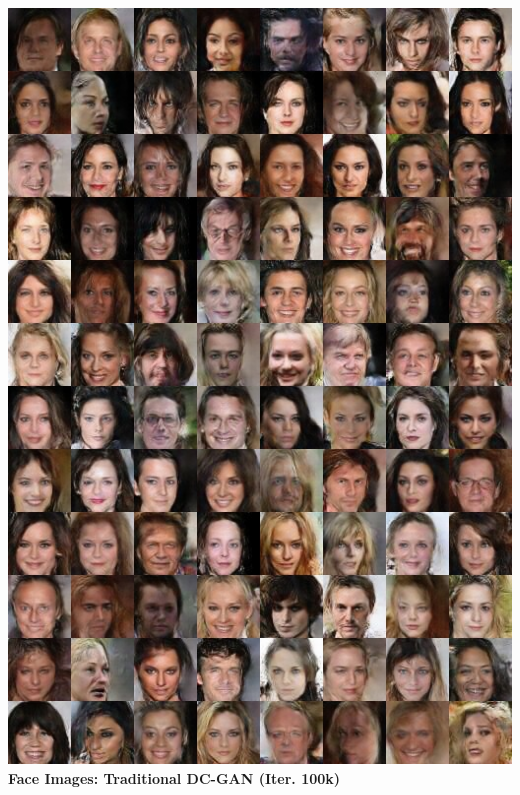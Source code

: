 \documentclass{article}
\begin{document}
\includegraphics[width=1.0\textwidth]{Figs/sup/dcg40k.jpg}\\
\clearpage
\textbf{Face Images: Traditional DC-GAN (Iter. 100k)}\\
\end{document}
